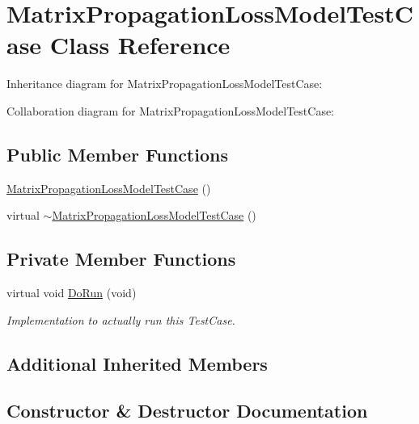 \hypertarget{classMatrixPropagationLossModelTestCase}{}\section{Matrix\+Propagation\+Loss\+Model\+Test\+Case Class Reference}
\label{classMatrixPropagationLossModelTestCase}


Inheritance diagram for Matrix\+Propagation\+Loss\+Model\+Test\+Case\+:


Collaboration diagram for Matrix\+Propagation\+Loss\+Model\+Test\+Case\+:
\subsection*{Public Member Functions}
\begin{DoxyCompactItemize}
\item 
\hyperlink{classMatrixPropagationLossModelTestCase_a0c2d2cd1ec485f8890534b94533fcdc3}{Matrix\+Propagation\+Loss\+Model\+Test\+Case} ()
\item 
virtual \hyperlink{classMatrixPropagationLossModelTestCase_aca825898a10ec80ff3ef66c0dfe75249}{$\sim$\+Matrix\+Propagation\+Loss\+Model\+Test\+Case} ()
\end{DoxyCompactItemize}
\subsection*{Private Member Functions}
\begin{DoxyCompactItemize}
\item 
virtual void \hyperlink{classMatrixPropagationLossModelTestCase_a31340c08bcf36d34a1734784cd376ae3}{Do\+Run} (void)
\begin{DoxyCompactList}\small\item\em Implementation to actually run this Test\+Case. \end{DoxyCompactList}\end{DoxyCompactItemize}
\subsection*{Additional Inherited Members}


\subsection{Constructor \& Destructor Documentation}
